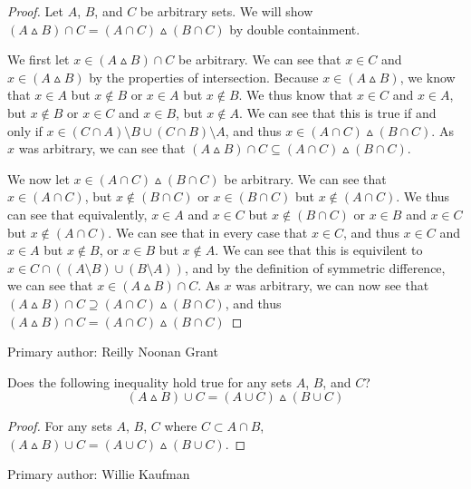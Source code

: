     \begin{proof}
    Let $A$, $B$, and $C$ be arbitrary sets. We will show $(A \vartriangle B) \cap C = (A \cap C) \vartriangle (B \cap C)$ by double containment.
    
    We first let $x \in (A \vartriangle B) \cap C$ be arbitrary. We can see that $x\in C$ and $x\in (A \vartriangle B)$ by the properties of intersection. Because $x\in (A \vartriangle B)$, we know that $x \in A$ but $x \notin B$ or $x \in A$ but $x \notin B$. We thus know that $x\in C$ and $x\in A$, but $x\notin B$ or $x\in C$ and $x\in B$, but $x \notin A$. We can see that this is true if and only if $x \in (C \cap A) \setminus B \cup (C \cap B)\setminus A$, and thus $x \in (A \cap C) \vartriangle (B \cap C)$. As $x$ was arbitrary, we can see that $(A \vartriangle B) \cap C \subseteq (A \cap C) \vartriangle (B \cap C)$.
    
    We now let $x \in (A \cap C) \vartriangle (B \cap C)$ be arbitrary. We can see that $x \in (A \cap C)$, but $x\notin (B \cap C)$ or $x\in (B \cap C)$ but $x\notin (A \cap C)$. We thus can see that equivalently, $x \in A$ and $x\in C$ but $x\notin (B \cap C)$ or $x \in B$ and $x\in C$ but $x\notin (A \cap C)$. We can see that in every case that $x \in C$, and thus $x\in C$ and $x \in A$ but $x\notin B$, or $x \in B$ but $x\notin A$. We can see that this is equivilent to $x \in C \cap ((A\setminus B) \cup (B \setminus A ))$, and by the definition of symmetric difference, we can see that $x \in (A \vartriangle B) \cap C$. As $x$ was arbitrary, we can now see that $(A \vartriangle B) \cap C \supseteq (A \cap C) \vartriangle (B \cap C)$, and thus $(A \vartriangle B) \cap C = (A \cap C) \vartriangle (B \cap C)$
    \end{proof}
Primary author: Reilly Noonan Grant
    \begin{minorEx}%
    Does the following inequality hold true for any sets $A$, $B$, and $C$? $$(A \vartriangle B) \cup C = (A \cup C) \vartriangle (B \cup C)$$
    \begin{proof}
    For any sets $A$, $B$, $C$ where $C \subset A \cap B$, $(A \vartriangle B) \cup C = (A \cup C) \vartriangle (B \cup C)$.
    \end{proof}
    \end{minorEx}
    Primary author: Willie Kaufman
